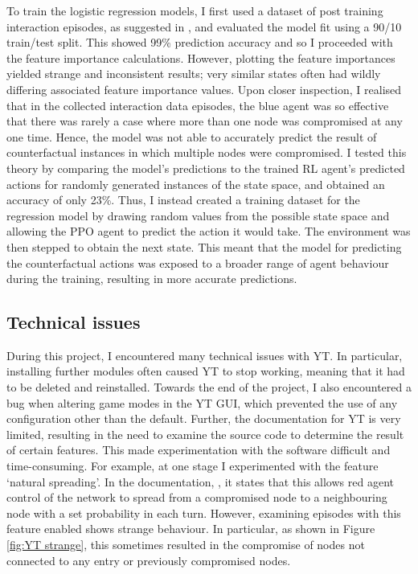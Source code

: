 \documentclass{article}
\begin{document}
To train the logistic regression models, I first used a dataset of post training interaction episodes, as suggested in \cite{wang2022causal}, and evaluated the model fit using a 90/10 train/test split. This showed 99\% prediction accuracy and so I proceeded with the feature importance calculations. However, plotting the feature importances yielded strange and inconsistent results; very similar states often had wildly differing associated feature importance values. Upon closer inspection, I realised that in the collected interaction data episodes, the blue agent was so effective that there was rarely a case where more than one node was compromised at any one time. Hence, the model was not able to accurately predict the result of counterfactual instances in which multiple nodes were compromised. I tested this theory by comparing the model's predictions to the trained RL agent's predicted actions for randomly generated instances of the state space, and obtained an accuracy of only 23\%. Thus, I instead created a training dataset for the regression model by drawing random values from the possible state space and allowing the PPO agent to predict the action it would take. The environment was then stepped to obtain the next state. This meant that the model for predicting the counterfactual actions was exposed to a broader range of agent behaviour during the training, resulting in more accurate predictions. 


\subsection{Technical issues}

During this project, I encountered many technical issues with YT. In particular, installing further modules often caused YT to stop working, meaning that it had to be deleted and reinstalled. Towards the end of the project, I also encountered a bug when altering game modes in the YT GUI, which prevented the use of any configuration other than the default. Further, the documentation for YT is very limited, resulting in the need to examine the source code to determine the result of certain features. This made experimentation with the software difficult and time-consuming. For example, at one stage I experimented with the feature `natural spreading'. In the documentation, \cite{YTdocs}, it states that this allows red agent control of the network to spread from a compromised node to a neighbouring node with a set probability in each turn. However, examining episodes with this feature enabled shows strange behaviour. In particular, as shown in Figure \ref{fig:YT strange}, this sometimes resulted in the compromise of nodes not connected to any entry or previously compromised nodes. 
\end{document}
